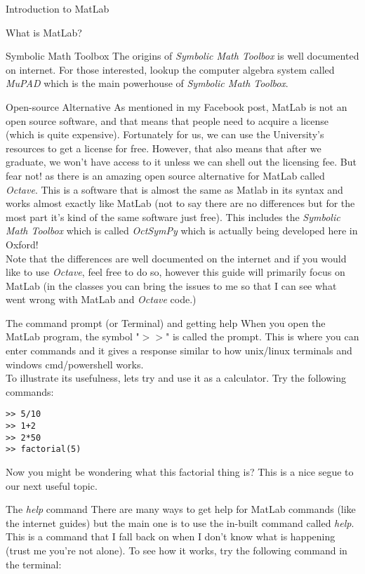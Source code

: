\documentclass[11pt, oneside]{report}   	%
\begin{document}
\begin{chapter}{Introduction to MatLab}
\begin{section}{What is MatLab?}
\begin{subsection}{Symbolic Math Toolbox}
The origins of \textit{Symbolic Math Toolbox} is well documented on internet. For those interested, lookup the computer algebra system called \textit{MuPAD} which is the main powerhouse of \textit{Symbolic Math Toolbox}.

\end{subsection}

\begin{subsection}{Open-source Alternative}
As mentioned in my Facebook post, MatLab is not an open source software, and that means that people need to acquire a license (which is quite expensive). Fortunately for
us, we can use the University's resources to get a license for free. However, that also means that after we graduate, we won't have access to it unless we can shell out the
licensing fee. But fear not! as there is an amazing open source alternative for MatLab called \textit{Octave}. This is a software that is almost the same as Matlab in its syntax
and works almost exactly like MatLab (not to say there are no differences but for the most part it's kind of the same software just free). This includes the \textit{Symbolic Math
Toolbox} which is called \textit{OctSymPy} which is actually being developed here in Oxford!
\\

Note that the differences are well documented on the internet and if you would like to use \textit{Octave}, feel free to do so, however this guide will primarily focus on MatLab
(in the classes you can bring the issues to me so that I can see what went wrong with MatLab and \textit{Octave} code.)
\end{subsection}

\end{section}

\begin{section}{The command prompt (or Terminal) and getting help}
When you open the MatLab program, the symbol "\(>\!\!>\)" is called the prompt. This is where you can enter commands and it gives a response similar to how unix/linux terminals
and windows cmd/powershell works.\\

To illustrate its usefulness, lets try and use it as a calculator. Try the following commands:

\begin{lstlisting}
>> 5/10
>> 1+2
>> 2*50
>> factorial(5)
\end{lstlisting}
Now you might be wondering what this factorial thing is? This is a nice segue to our next useful topic.
\begin{subsection}{The \textit{help} command}
There are many ways to get help for MatLab commands (like the internet guides) but the main one is to use the in-built command called \textit{help}. This is a command that I fall
back on when I don't know what is happening (trust me you're not alone). To see how it works, try the following command in the terminal:


\end{subsection}
\end{section}
\end{chapter}
\end{document}
